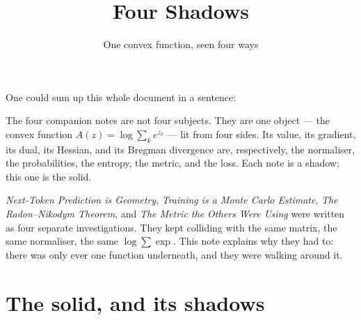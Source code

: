 \documentclass[11pt]{article}
\title{\color{inkblue}\bfseries Four Shadows}
\author{One convex function, seen four ways}
\date{}
\begin{document}
\maketitle
\thispagestyle{empty}

One could sum up this whole document in a sentence:
\begin{summary}
The four companion notes are not four subjects. They are one object --- the convex function
$A(z) = \log\sum_k e^{z_k}$ --- lit from four sides. Its value, its gradient, its dual, its
Hessian, and its Bregman divergence are, respectively, the normaliser, the probabilities, the
entropy, the metric, and the loss. Each note is a shadow; this one is the solid.
\end{summary}
\emph{Next-Token Prediction is Geometry}, \emph{Training is a Monte Carlo Estimate}, \emph{The
Radon--Nikodym Theorem}, and \emph{The Metric the Others Were Using} were written as four
separate investigations. They kept colliding with the same matrix, the same normaliser, the
same $\log\sum\exp$. This note explains why they had to: there was only ever one function
underneath, and they were walking around it.

\section{The solid, and its shadows}

\begin{center}
\end{center}
\end{document}
